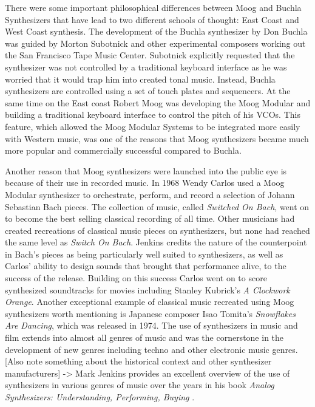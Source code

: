 There were some important philosophical differences between Moog and Buchla Synthesizers that have lead to two different schools of thought: East Coast and West Coast synthesis. The development of the Buchla synthesizer by Don Buchla was guided by Morton Subotnick and other experimental composers working out the San Francisco Tape Music Center. Subotnick explicitly requested that the synthesizer was not controlled by a traditional keyboard interface as he was worried that it would trap him into created tonal music. Instead, Buchla synthesizers are controlled using a set of touch plates and sequencers. At the same time on the East coast Robert Moog was developing the Moog Modular and building a traditional keyboard interface to control the pitch of his VCOs. This feature, which allowed the Moog Modular Systems to be integrated more easily with Western music, was one of the reasons that Moog synthesizers became much more popular and commercially successful compared to Buchla. 

Another reason that Moog synthesizers were launched into the public eye is because of their use in recorded music. In 1968 Wendy Carlos used a Moog Modular synthesizer to orchestrate, perform, and record a selection of Johann Sebastian Bach pieces. The collection of music, called \textit{Switched On Bach}, went on to become the best selling classical recording of all time. Other musicians had created recreations of classical music pieces on synthesizers, but none had reached the same level as \textit{Switch On Bach}. Jenkins \cite{jenkins2019analog} credits the nature of the counterpoint in Bach's pieces as being particularly well suited to synthesizers, as well as Carlos' ability to design sounds that brought that performance alive, to the success of the release. Building on this success Carlos went on to score synthesized soundtracks for movies including Stanley Kubrick's \textit{A Clockwork Orange}. Another exceptional example of classical music recreated using Moog synthesizers worth mentioning is Japanese composer Isao Tomita's \textit{Snowflakes Are Dancing}, which was released in 1974. The use of synthesizers in music and film extends into almost all genres of music and was the cornerstone in the development of new genres including techno and other electronic music genres. [Also note something about the historical context and other synthesizer manufacturers] -> Mark Jenkins provides an excellent overview of the use of synthesizers in various genres of music over the years in his book \textit{Analog Synthesizers: Understanding, Performing, Buying} \cite{jenkins2019analog}.

